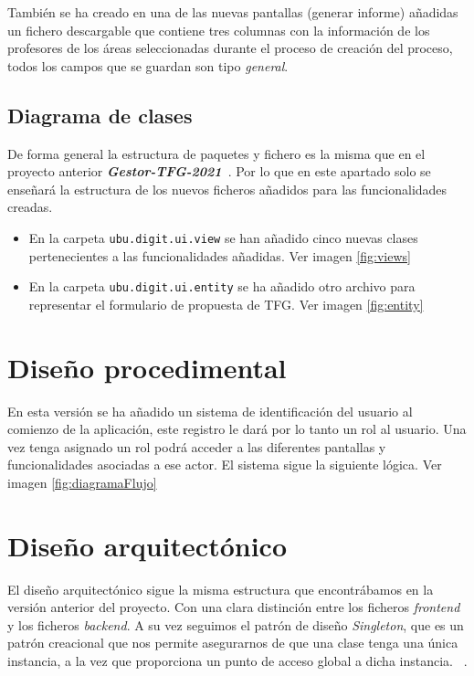 También se ha creado en una de las nuevas pantallas (generar informe) añadidas un fichero descargable que contiene tres columnas con la información de los profesores de los áreas seleccionadas durante el proceso de creación del proceso, todos los campos que se guardan son tipo \emph{general}.

\subsection{Diagrama de clases}

De forma general la estructura de paquetes y fichero es la misma que en el proyecto anterior \textbf{\textit{Gestor-TFG-2021}}~\cite{Gestor-TFG-2021}. Por lo que en este apartado solo se enseñará la estructura de los nuevos ficheros añadidos para las funcionalidades creadas.

\begin{itemize}
	\item En la carpeta \texttt{ubu.digit.ui.view} se han añadido cinco nuevas clases pertenecientes a las funcionalidades añadidas. Ver imagen \ref{fig:views}
	
	
	\item En la carpeta \texttt{ubu.digit.ui.entity} se ha añadido otro archivo para representar el formulario de propuesta de TFG. Ver imagen \ref{fig:entity}
	
	
\end{itemize}

\section{Diseño procedimental}
En esta versión se ha añadido un sistema de identificación del usuario al comienzo de la aplicación, este registro le dará por lo tanto un rol al usuario. Una vez tenga asignado un rol podrá acceder a las diferentes pantallas y funcionalidades asociadas a ese actor.
El sistema sigue la siguiente lógica. Ver imagen \ref{fig:diagramaFlujo}


\section{Diseño arquitectónico}

El diseño arquitectónico sigue la misma estructura que encontrábamos en la versión anterior del proyecto. Con una clara distinción entre los ficheros \emph{frontend} y los ficheros \emph{backend}.
A su vez seguimos el patrón de diseño \emph{Singleton}, que es un patrón creacional que nos permite asegurarnos de que una clase tenga una única instancia, a la vez que proporciona un punto de acceso global a dicha instancia. ~\cite{Singleton}.
